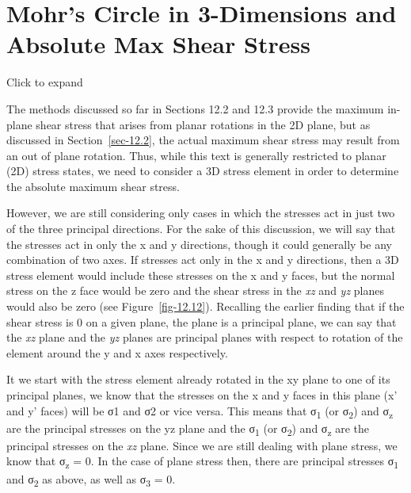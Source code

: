 \documentclass[
  letterpaper,
  DIV=11,
  numbers=noendperiod]{scrreprt}
\theoremstyle{definition}
\theoremstyle{remark}
\begin{document}
\section{Mohr's Circle in 3-Dimensions and Absolute Max Shear
Stress}\label{sec-12.4}

Click to expand

The methods discussed so far in Sections 12.2 and 12.3 provide the
maximum in-plane shear stress that arises from planar rotations in the
2D plane, but as discussed in Section~\ref{sec-12.2}, the actual maximum
shear stress may result from an out of plane rotation. Thus, while this
text is generally restricted to planar (2D) stress states, we need to
consider a 3D stress element in order to determine the absolute maximum
shear stress.

However, we are still considering only cases in which the stresses act
in just two of the three principal directions. For the sake of this
discussion, we will say that the stresses act in only the x and y
directions, though it could generally be any combination of two axes. If
stresses act only in the x and y directions, then a 3D stress element
would include these stresses on the x and y faces, but the normal stress
on the z face would be zero and the shear stress in the \emph{xz} and
\emph{yz} planes would also be zero (see Figure~\ref{fig-12.12}).
Recalling the earlier finding that if the shear stress is 0 on a given
plane, the plane is a principal plane, we can say that the \emph{xz}
plane and the \emph{yz} planes are principal planes with respect to
rotation of the element around the y and x axes respectively.

It we start with the stress element already rotated in the xy plane to
one of its principal planes, we know that the stresses on the x and y
faces in this plane (x' and y' faces) will be σ1 and σ2 or vice versa.
This means that σ\textsubscript{1} (or σ\textsubscript{2}) and
σ\textsubscript{z} are the principal stresses on the yz plane and the
σ\textsubscript{1} (or σ\textsubscript{2}) and σ\textsubscript{z} are
the principal stresses on the \emph{xz} plane. Since we are still
dealing with plane stress, we know that σ\textsubscript{z} = 0. In the
case of plane stress then, there are principal stresses
σ\textsubscript{1} and σ\textsubscript{2} as above, as well as
σ\textsubscript{3} = 0.
\end{document}
